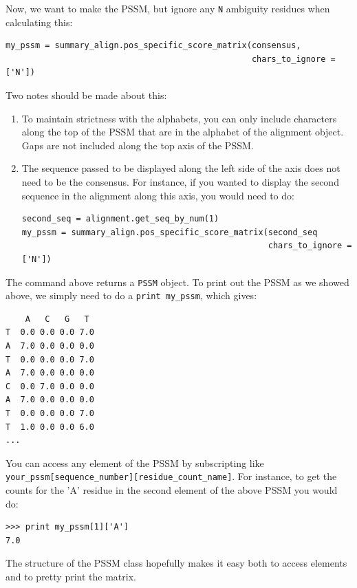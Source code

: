 \documentclass{report}
\begin{document}
Now, we want to make the PSSM, but ignore any \verb|N| ambiguity residues when calculating this:

\begin{verbatim}
my_pssm = summary_align.pos_specific_score_matrix(consensus,
                                                  chars_to_ignore = ['N'])
\end{verbatim}

Two notes should be made about this:

\begin{enumerate}
  \item To maintain strictness with the alphabets, you can only include characters along the top of the PSSM that are in the alphabet of the alignment object. Gaps are not included along the top axis of the PSSM.

  \item The sequence passed to be displayed along the left side of the axis does not need to be the consensus. For instance, if you wanted to display the second sequence in  the alignment along this axis, you would need to do:

\begin{verbatim}
second_seq = alignment.get_seq_by_num(1)
my_pssm = summary_align.pos_specific_score_matrix(second_seq
                                                  chars_to_ignore = ['N'])
\end{verbatim}

\end{enumerate}

The command above returns a \verb|PSSM| object. To print out the PSSM as we showed above, we simply need to do a \verb|print my_pssm|, which gives:

\begin{verbatim}
    A   C   G   T
T  0.0 0.0 0.0 7.0
A  7.0 0.0 0.0 0.0
T  0.0 0.0 0.0 7.0
A  7.0 0.0 0.0 0.0
C  0.0 7.0 0.0 0.0
A  7.0 0.0 0.0 0.0
T  0.0 0.0 0.0 7.0
T  1.0 0.0 0.0 6.0
...
\end{verbatim}

You can access any element of the PSSM by subscripting like \verb|your_pssm[sequence_number][residue_count_name]|. For instance, to get the counts for the 'A' residue in the second element of the above PSSM you would do:

\begin{verbatim}
>>> print my_pssm[1]['A']
7.0
\end{verbatim}

The structure of the PSSM class hopefully makes it easy both to access elements and to pretty print the matrix.
\end{document}

